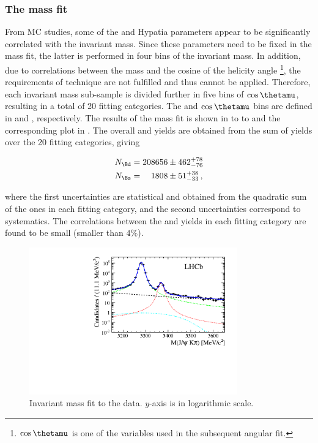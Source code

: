 \subsubsection{The mass fit}
From MC studies, some of the \Bs and \Bd Hypatia parameters appear to be significantly correlated with the \mkpi invariant mass. 
Since these parameters need to be fixed in the mass fit, the latter is performed in four bins of the
\mkpi invariant mass. In addition, due to correlations between the mass and the cosine of the helicity angle \thetamu\footnote{$\cos\thetamu$ is one of 
the variables used in the subsequent angular fit.},
the requirements of \sPlot technique are not fulfilled and thus cannot be applied. Therefore, each \mkpi invariant mass sub-sample
is divided further in five bins of $\cos\thetamu$, resulting in a total of 20 fitting categories. The \mkpi and $\cos\thetamu$ bins are defined
in  and , respectively. The results of the mass fit is shown in  to
to  and the corresponding plot in . The overall \Bs and \Bd yields are obtained from the sum 
of yields over the 20 fitting categories, giving

\begin{align}
N_{\Bd} &= 208656  \pm  462 ^{+ 78	}_{- 76}\\
N_{\Bs} &= \phantom{00}1808  \pm   51 ^{+ 38	}_{- 33} \, ,
\label{signal_yields}
\end{align}

\noindent where the first uncertainties are statistical and obtained from the quadratic sum of the ones in each fitting category, 
and the second uncertainties correspond to systematics. The correlations between the \Bd and \Bs yields in each fitting category
are found to be small (smaller than $4\%$).

\begin{figure}[h]
\begin{center}
  \includegraphics[width=0.8\textwidth]{Figures/Chapter4/mass_plot_simul_log.pdf}
  \caption{Invariant mass fit to the data. $y$-axis is in logarithmic scale.}
  \label{mass_plot}
\end{center}
\end{figure}

